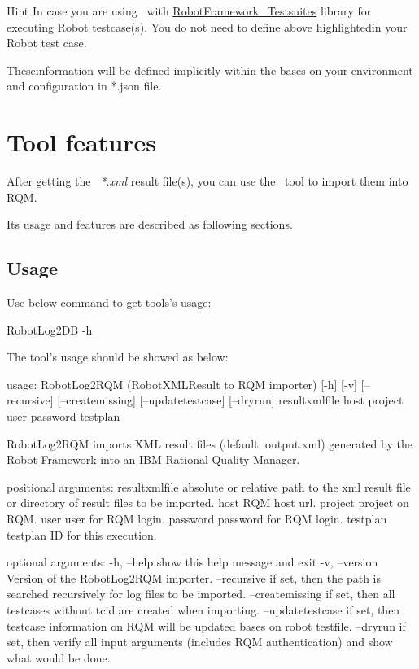 \begin{boxhint} {Hint}
  In case you are using \rfw\ with
  \href{https://github.com/test-fullautomation/robotframework-testsuitesmanagement}{RobotFramework\_Testsuites}
  library for executing Robot testcase(s).
  You do not need to define above highlightedin your Robot test case.

  Theseinformation will be defined implicitly within the
   bases on your environment and configuration in *.json file.
\end{boxhint}

\hypertarget{description-tool-features}{%
\section{Tool features}\label{description-tool-features}}

After getting the \rfwcore\ \emph{*.xml} result file(s), you can use the \pkg\ tool to
import them into RQM.

Its usage and features are described as following sections.

\subsection{Usage}
Use below command to get tools's usage:
\begin{robotlog}
RobotLog2DB -h
\end{robotlog}

The tool's usage should be showed as below:
\begin{robotlog}
usage: RobotLog2RQM (RobotXMLResult to RQM importer) [-h] [-v] [--recursive]
                    [--createmissing] [--updatetestcase] [--dryrun]
                    resultxmlfile host project user password testplan

RobotLog2RQM imports XML result files (default: output.xml) generated by the
                  Robot Framework into an IBM Rational Quality Manager.

positional arguments:
resultxmlfile     absolute or relative path to the xml result file
                  or directory of result files to be imported.
host              RQM host url.
project           project on RQM.
user              user for RQM login.
password          password for RQM login.
testplan          testplan ID for this execution.

optional arguments:
-h, --help        show this help message and exit
-v, --version     Version of the RobotLog2RQM importer.
--recursive       if set, then the path is searched recursively for
                  log files to be imported.
--createmissing   if set, then all testcases without tcid are created
                  when importing.
--updatetestcase  if set, then testcase information on RQM will be updated
                  bases on robot testfile.
--dryrun          if set, then verify all input arguments
                  (includes RQM authentication) and show what would be done.
\end{robotlog}

